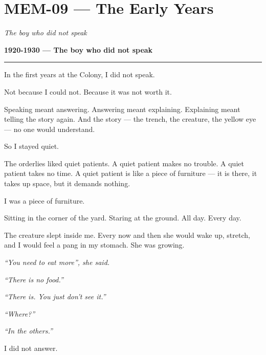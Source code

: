 \section*{\textbf{MEM-09} --- The Early Years}

\noindent \textit{The boy who did not speak}

\noindent \textbf{1920-1930 --- The boy who did not speak}

\vspace{0.5em}\noindent\rule{\textwidth}{0.5pt}\vspace{0.5em}

\noindent In the first years at the Colony, I did not speak.

\noindent Not because I could not. Because it was not worth it.

\noindent Speaking meant answering. Answering meant explaining. Explaining meant telling the story again. And the story --- the trench, the creature, the yellow eye --- no one would understand.

\noindent So I stayed quiet.

\noindent The orderlies liked quiet patients. A quiet patient makes no trouble. A quiet patient takes no time. A quiet patient is like a piece of furniture --- it is there, it takes up space, but it demands nothing.

\noindent I was a piece of furniture.

\noindent Sitting in the corner of the yard. Staring at the ground. All day. Every day.

\noindent The creature slept inside me. Every now and then she would wake up, stretch, and I would feel a pang in my stomach. She was growing.

\noindent \textit{\textquotedblleft{}You need to eat more\textquotedblright{}, she said.}

\noindent \textit{\textquotedblleft{}There is no food.\textquotedblright{}}

\noindent \textit{\textquotedblleft{}There is. You just don't see it.\textquotedblright{}}

\noindent \textit{\textquotedblleft{}Where?\textquotedblright{}}

\noindent \textit{\textquotedblleft{}In the others.\textquotedblright{}}

\noindent I did not answer.


